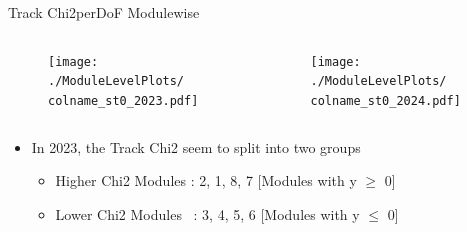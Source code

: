 \begin{frame}{Track Chi2perDoF Modulewise}
    \newcommand{\colname}{Track_Chi2perDoF}
    \begin{columns}
        \begin{column}{0.6\linewidth}
            \begin{figure}
                \centering
                \texttt{[image: ./ModuleLevelPlots/\\colname\_st0\_2023.pdf]}
            \end{figure}
        \end{column}
        \begin{column}{0.6\linewidth}
            \begin{figure}
                \centering
                \texttt{[image: ./ModuleLevelPlots/\\colname\_st0\_2024.pdf]}
            \end{figure}
        \end{column}
    \end{columns}

    \begin{itemize}
        \small
        \item In 2023, the Track Chi2 seem to split into two groups
        \begin{itemize}
            \item Higher Chi2 Modules : 2, 1, 8, 7 [Modules with y $\geq$ 0]
            \item Lower Chi2 Modules \ : 3, 4, 5, 6  [Modules with y $\leq$ 0]
        \end{itemize}
    \end{itemize}
\end{frame}

